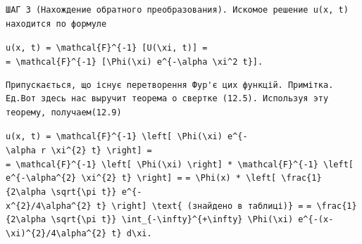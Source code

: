 \documentclass[
  ukrainian,
]{article}
\begin{document}
\begin{verbatim}
ШАГ 3 (Нахождение обратного преобразования). Искомое решение u(x, t) находится по формуле
\end{verbatim}

\texttt{u(x,\ t)\ =\ \textbackslash{}mathcal\{F\}\^{}\{-1\}\ {[}U(\textbackslash{}xi,\ t){]}\ =}
\texttt{=\ \textbackslash{}mathcal\{F\}\^{}\{-1\}\ {[}\textbackslash{}Phi(\textbackslash{}xi)\ e\^{}\{-\textbackslash{}alpha\ \textbackslash{}xi\^{}2\ t\}{]}.}

\begin{verbatim}
Припускається, що існує перетворення Фур'є цих функцій. Примітка. Ед.Вот здесь нас выручит теорема о свертке (12.5). Используя эту теорему, получаем(12.9)
\end{verbatim}

\texttt{u(x,\ t)\ =\ \textbackslash{}mathcal\{F\}\^{}\{-1\}\ \textbackslash{}left{[}\ \textbackslash{}Phi(\textbackslash{}xi)\ e\^{}\{-\textbackslash{}alpha\ r\ \textbackslash{}xi\^{}\{2\}\ t\}\ \textbackslash{}right{]}\ =}
\texttt{=\ \textbackslash{}mathcal\{F\}\^{}\{-1\}\ \textbackslash{}left{[}\ \textbackslash{}Phi(\textbackslash{}xi)\ \textbackslash{}right{]}\ *\ \textbackslash{}mathcal\{F\}\^{}\{-1\}\ \textbackslash{}left{[}\ e\^{}\{-\textbackslash{}alpha\^{}\{2\}\ \textbackslash{}xi\^{}\{2\}\ t\}\ \textbackslash{}right{]}\ =}
\texttt{=\ \textbackslash{}Phi(x)\ *\ \textbackslash{}left{[}\ \textbackslash{}frac\{1\}\{2\textbackslash{}alpha\ \textbackslash{}sqrt\{\textbackslash{}pi\ t\}\}\ e\^{}\{-x\^{}\{2\}/4\textbackslash{}alpha\^{}\{2\}\ t\}\ \textbackslash{}right{]}\ \textbackslash{}text\{\ (знайдено\ в\ таблиці)\}\ =}
\texttt{=\ \textbackslash{}frac\{1\}\{2\textbackslash{}alpha\ \textbackslash{}sqrt\{\textbackslash{}pi\ t\}\}\ \textbackslash{}int\_\{-\textbackslash{}infty\}\^{}\{+\textbackslash{}infty\}\ \textbackslash{}Phi(\textbackslash{}xi)\ e\^{}\{-(x-\textbackslash{}xi)\^{}\{2\}/4\textbackslash{}alpha\^{}\{2\}\ t\}\ d\textbackslash{}xi.}
\end{document}
